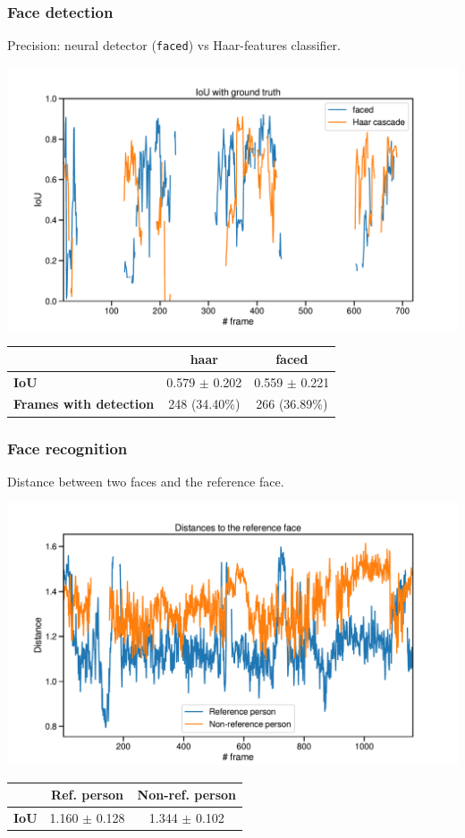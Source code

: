 \documentclass[11pt]{beamer}
\begin{document}
\begin{frame}
	\frametitle{Face detection}
	Precision: neural detector (\texttt{faced}) vs Haar-features classifier.
	\begin{center}
		\includegraphics[width=0.8\linewidth]{test2}
	\end{center}

	\begin{table}[h]
		\tiny
		\begin{tabular}{|l|c|c|}
			\hline
			& \textbf{haar}             & \textbf{faced}              \\ \hline
			\textbf{IoU}            & 0.579 $\pm$  0.202 & 0.559 $\pm$  0.221 \\ \hline
			\textbf{Frames with detection} & 248 (34.40\%) & 266 (36.89\%) \\ \hline
		\end{tabular}
	\end{table}
\end{frame}

\begin{frame}
	\frametitle{Face recognition}
	Distance between two faces and the reference face.
	\begin{center}
		\includegraphics[width=0.85\linewidth]{test4}
	\end{center}

	\begin{table}[h]
		\tiny
		\begin{tabular}{|l|c|c|}
			\hline
			& \textbf{Ref. person} & \textbf{Non-ref. person} \\ \hline
			\textbf{IoU}           & 1.160 $\pm$  0.128 & 1.344 $\pm$  0.102 \\ \hline
		\end{tabular}
	\end{table}	
	
\end{frame}
\end{document}
